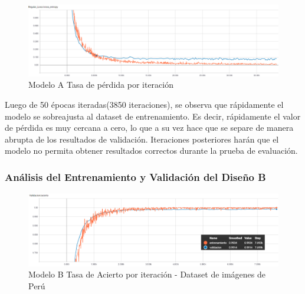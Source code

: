 			\begin{figure}[H]
				\begin{center}
				\includegraphics[width=1\textwidth]{images/desarrollo/trainResults/peru/model0Loss} 
				\end{center}
				\begin{center}
				\caption{\small{Modelo A Tasa de pérdida por iteración}}
				
				{\small{\fontsize{10}{16.8}\selectfont {Fuente: Elaboración propia}}}
				\end{center}
				\vspace{-1.5em}
			\end{figure}

			Luego de 50 épocas iteradas(3850 iteraciones), se observa que rápidamente el modelo se sobreajusta al dataset de entrenamiento. Es decir, rápidamente el valor de pérdida es muy cercana a cero, lo que a su vez hace que se separe de manera abrupta de los resultados de validación. Iteraciones posteriores harán que el modelo no permita obtener resultados correctos durante la prueba de evaluación.


		\subsubsection{Análisis del Entrenamiento y Validación del Diseño B}  
		
			\begin{figure}[H]
				\begin{center}
				\includegraphics[width=1\textwidth]{images/desarrollo/trainResults/peru/model1Acierto} 
				\end{center}
				\begin{center}
				\caption{\small{Modelo B Tasa de Acierto por iteración - Dataset de imágenes de Perú  }}
				
				{\small{\fontsize{10}{16.8}\selectfont {Fuente: Elaboración propia}}}
				\end{center}
				\vspace{-1.5em}
			\end{figure}
		
